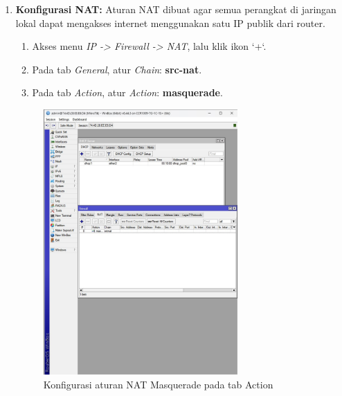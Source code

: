 \begin{enumerate}
    \item \textbf{Konfigurasi NAT:} Aturan NAT dibuat agar semua perangkat di jaringan lokal dapat mengakses internet menggunakan satu IP publik dari router.
    \begin{enumerate}
        \item Akses menu \textit{IP -> Firewall -> NAT}, lalu klik ikon `+`.
        \item Pada tab \textit{General}, atur \textit{Chain}: \textbf{src-nat}.
        \item Pada tab \textit{Action}, atur \textit{Action}: \textbf{masquerade}.
    \end{enumerate}
    \begin{figure}[H]
        \centering
        \includegraphics[width=0.7\textwidth]{img4/NATMasqueerade.jpeg}
        \caption{Konfigurasi aturan NAT Masquerade pada tab Action}
    \end{figure}
    

\end{enumerate}
